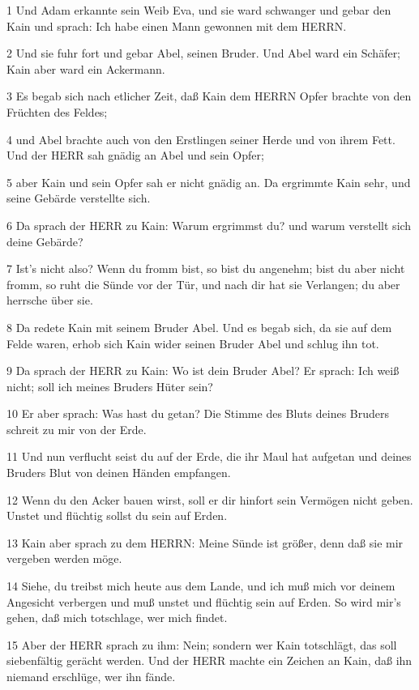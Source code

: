 \par 1 Und Adam erkannte sein Weib Eva, und sie ward schwanger und gebar den Kain und sprach: Ich habe einen Mann gewonnen mit dem HERRN.
\par 2 Und sie fuhr fort und gebar Abel, seinen Bruder. Und Abel ward ein Schäfer; Kain aber ward ein Ackermann.
\par 3 Es begab sich nach etlicher Zeit, daß Kain dem HERRN Opfer brachte von den Früchten des Feldes;
\par 4 und Abel brachte auch von den Erstlingen seiner Herde und von ihrem Fett. Und der HERR sah gnädig an Abel und sein Opfer;
\par 5 aber Kain und sein Opfer sah er nicht gnädig an. Da ergrimmte Kain sehr, und seine Gebärde verstellte sich.
\par 6 Da sprach der HERR zu Kain: Warum ergrimmst du? und warum verstellt sich deine Gebärde?
\par 7 Ist's nicht also? Wenn du fromm bist, so bist du angenehm; bist du aber nicht fromm, so ruht die Sünde vor der Tür, und nach dir hat sie Verlangen; du aber herrsche über sie.
\par 8 Da redete Kain mit seinem Bruder Abel. Und es begab sich, da sie auf dem Felde waren, erhob sich Kain wider seinen Bruder Abel und schlug ihn tot.
\par 9 Da sprach der HERR zu Kain: Wo ist dein Bruder Abel? Er sprach: Ich weiß nicht; soll ich meines Bruders Hüter sein?
\par 10 Er aber sprach: Was hast du getan? Die Stimme des Bluts deines Bruders schreit zu mir von der Erde.
\par 11 Und nun verflucht seist du auf der Erde, die ihr Maul hat aufgetan und deines Bruders Blut von deinen Händen empfangen.
\par 12 Wenn du den Acker bauen wirst, soll er dir hinfort sein Vermögen nicht geben. Unstet und flüchtig sollst du sein auf Erden.
\par 13 Kain aber sprach zu dem HERRN: Meine Sünde ist größer, denn daß sie mir vergeben werden möge.
\par 14 Siehe, du treibst mich heute aus dem Lande, und ich muß mich vor deinem Angesicht verbergen und muß unstet und flüchtig sein auf Erden. So wird mir's gehen, daß mich totschlage, wer mich findet.
\par 15 Aber der HERR sprach zu ihm: Nein; sondern wer Kain totschlägt, das soll siebenfältig gerächt werden. Und der HERR machte ein Zeichen an Kain, daß ihn niemand erschlüge, wer ihn fände.
